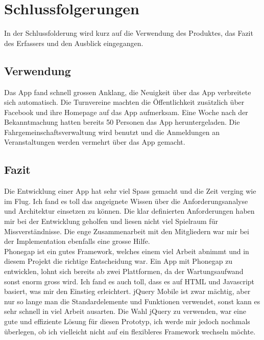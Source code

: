 %
%

\chapter{Schlussfolgerungen}\label{chap.Schlussfolgerungen}
In der Schlussfolderung wird kurz auf die Verwendung des Produktes, das Fazit des Erfassers und den Ausblick eingegangen.

\section{Verwendung}\label{fazit_verwendung}
Das App fand schnell grossen Anklang, die Neuigkeit über das App verbreitete sich automatisch. Die Turnvereine machten die Öffentlichkeit zusätzlich über Facebook und ihre Homepage auf das App aufmerksam. Eine Woche nach der Bekanntmachung hatten bereits 50 Personen das App heruntergeladen. Die Fahrgemeinschaftsverwaltung wird benutzt und die Anmeldungen an Veranstaltungen werden vermehrt über das App gemacht.

\section{Fazit}\label{fazit}

Die Entwicklung einer App hat sehr viel Spass gemacht und die Zeit verging wie im Flug. Ich fand es toll das angeignete Wissen über die Anforderungsanalyse und Architektur einsetzen zu können. Die klar definierten Anforderungen haben mir bei der Entwicklung geholfen und liesen nicht viel Spielraum für Missverständnisse. Die enge Zusammenarbeit mit den Mitgliedern war mir bei der Implementation ebenfalls eine grosse Hilfe.\\

Phonegap ist ein gutes Framework, welches einem viel Arbeit abnimmt und in diesem Projekt die richtige Entscheidung war. Ein App mit Phonegap zu entwicklen, lohnt sich bereits ab zwei Plattformen, da der Wartungsaufwand sonst enorm gross wird. Ich fand es auch toll, dass es auf HTML und Javascript basiert, was mir den Einstieg erleichtert. jQuery Mobile ist zwar mächtig, aber nur so lange man die Standardelemente und Funktionen verwendet, sonst kann es sehr schnell in viel Arbeit ausarten. Die Wahl jQuery zu verwenden, war eine gute und effiziente Lösung für diesen Prototyp, ich werde mir jedoch nochmals überlegen, ob ich vielleicht nicht auf ein flexibleres Framework wechseln möchte.\\

